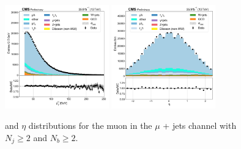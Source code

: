 \begin{figure}[htb!]
    \centering
    \includegraphics[width=0.4\textwidth]{chapters/Appendix/sectionPlots/figures/data_mc_overlays/mujet_2016_cat_gt4_gt2_signal_linear_lepton_lepton1_pt}
    \includegraphics[width=0.4\textwidth]{chapters/Appendix/sectionPlots/figures/data_mc_overlays/mujet_2016_cat_gt4_gt2_signal_linear_lepton_lepton1_eta}
    \caption{\pt and $\eta$ distributions for the muon in the $\mu$ + jets
    channel with $N_{j} \geq 2$ and $N_{b} \geq 2$.
    \label{fig:mujet_2_kinematic}}
\end{figure}

